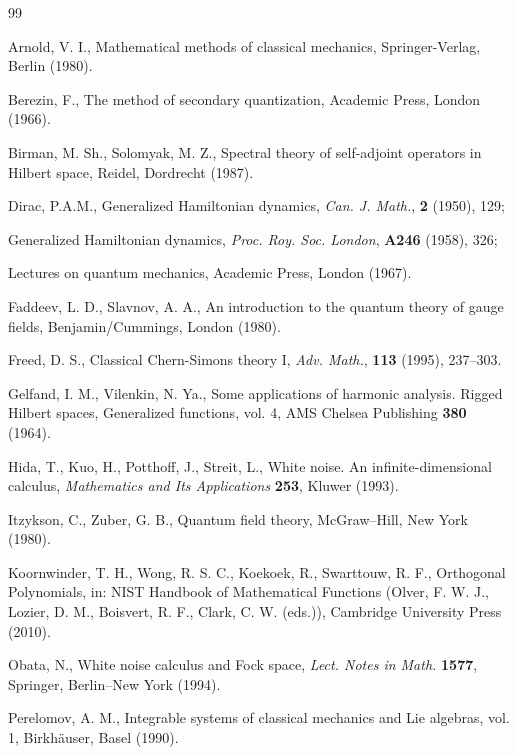 \documentclass{amsart}
\begin{document}
\begin{thebibliography}{99}

 Arnold, V. I., Mathematical methods of classical mechanics,
Springer-Verlag, Berlin (1980).

 Berezin, F., The method of secondary quantization, Academic Press, London (1966).

 Birman, M. Sh., Solomyak, M. Z., Spectral theory of
self-adjoint operators in Hilbert space, Reidel, Dordrecht (1987).

 Dirac, P.A.M.,  Generalized Hamiltonian dynamics, {\em Can. J. Math.}, {\bf 2} (1950), 129;

Generalized Hamiltonian dynamics, {\em Proc. Roy. Soc. London}, {\bf A246} (1958), 326;

Lectures on quantum mechanics, Academic Press, London (1967).

 Faddeev, L. D., Slavnov, A. A., An introduction to the quantum theory of gauge fields, Benjamin/Cummings, London (1980).

 Freed, D. S., Classical Chern-Simons theory I, {\em Adv. Math.}, {\bf 113} (1995), 237--303.

 Gelfand, I. M., Vilenkin, N. Ya., Some applications of harmonic
analysis. Rigged Hilbert spaces, Generalized functions, vol. 4, AMS Chelsea Publishing {\bf 380} (1964).

 Hida, T., Kuo, H., Potthoff, J., Streit, L., White noise. An infinite-dimensional calculus, {\em Mathematics and Its Applications} {\bf 253},  Kluwer (1993).

 Itzykson, C., Zuber, G. B., Quantum field theory, McGraw--Hill, New York (1980).


 Koornwinder, T. H., Wong, R. S. C., Koekoek, R., Swarttouw, R. F., Orthogonal Polynomials, { in: NIST Handbook of Mathematical Functions (Olver, F. W. J., Lozier, D. M., Boisvert, R. F., Clark, C. W. (eds.))}, Cambridge University Press (2010).

 Obata, N., White noise calculus and Fock space, {\em Lect. Notes in Math.} {\bf 1577}, Springer, Berlin--New York (1994). 

 Perelomov, A. M., Integrable systems of classical mechanics
and Lie algebras, vol. 1, Birkh\"{a}user, Basel (1990).


\end{thebibliography}
\end{document}
